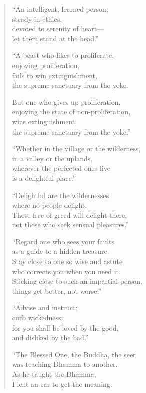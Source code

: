 \documentclass[12pt,openany]{book}%
\begin{document}
\begin{verse}
“An intelligent, learned person, \\
steady in ethics, \\
devoted to serenity of heart—\\
let them stand at the head.” 

“A beast who likes to proliferate, \\
enjoying proliferation, \\
fails to win extinguishment, \\
the supreme sanctuary from the yoke. 

But one who gives up proliferation, \\
enjoying the state of non-proliferation, \\
wins extinguishment, \\
the supreme sanctuary from the yoke.” 

“Whether in the village or the wilderness, \\
in a valley or the uplands, \\
wherever the perfected ones live \\
is a delightful place.” 

“Delightful are the wildernesses \\
where no people delight. \\
Those free of greed will delight there, \\
not those who seek sensual pleasures.” 

“Regard one who sees your faults \\
as a guide to a hidden treasure. \\
Stay close to one so wise and astute \\
who corrects you when you need it. \\
Sticking close to such an impartial person, \\
things get better, not worse.” 

“Advise and instruct; \\
curb wickedness: \\
for you shall be loved by the good, \\
and disliked by the bad.” 

“The Blessed One, the Buddha, the seer \\
was teaching Dhamma to another. \\
As he taught the Dhamma, \\
I lent an ear to get the meaning. 


\end{verse}
\end{document}
